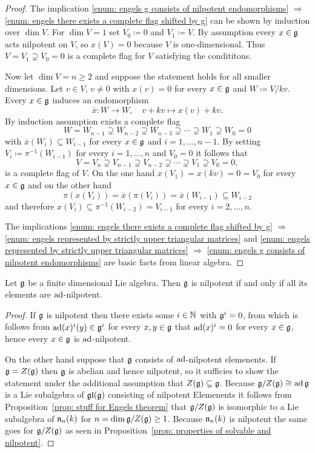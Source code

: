 \begin{proof}
 The implication \ref{enum: engels g consists of nilpotent endomorphisms} $\Rightarrow$ \ref{enum: engels there exists a complete flag shifted by g} can be shown by induction over $\dim V$. For $\dim V = 1$ set $V_0 \coloneqq 0$ and $V_1 \coloneqq V$. By assumption every $x \in \mathfrak{g}$ acts nilpotent on $V$, so $x(V) = 0$ because $V$ is one-dimensional. Thus $V = V_1 \supsetneq V_0 = 0$ is a complete flag for $V$ satisfying the condititons.
   
 Now let $\dim V = n \geq 2$ and suppose the statement holds for all smaller dimensions. Let $v \in V$, $v \neq 0$ with $x(v) = 0$ for every $x \in \mathfrak{g}$ and $W \coloneqq V / kv$. Every $x \in \mathfrak{g}$ induces an endomorphism
 \[
  \overline{x} \colon W \to W, \quad v + kv \mapsto x(v) + kv.
 \]
 By induction assumption exists a complete flag
 \[
  W = W_{n-1} \supsetneq W_{n-2} \supsetneq W_{n-3} \supsetneq \dotsb \supsetneq W_1 \supsetneq W_0 = 0
 \]
 with $\overline{x}(W_i) \subseteq W_{i-1}$ for every $x \in \mathfrak{g}$ and $i = 1, \dotsc, n-1$. By setting $V_i \coloneqq \pi^{-1}(W_{i-1})$ for every $i = 1, \dotsc, n$ and $V_0 = 0$ it follows that
 \[
  V = V_n \supsetneq V_{n-1} \supsetneq V_{n-2} \supsetneq \dotsb \supsetneq V_1 \supsetneq V_0 = 0,
 \]
 is a complete flag of $V$. On the one hand $x(V_1) = x(kv) = 0 = V_0$ for every $x \in \mathfrak{g}$ and on the other hand
 \[
  \pi(x(V_i))
  = \overline{x}(\pi(V_i))
  = \overline{x}(W_{i-1})
  \subseteq W_{i-2}
 \]
 and therefore $x(V_i) \subseteq \pi^{-1}(W_{i-2}) = V_{i-1}$ for every $i = 2, \dotsc, n$.
 
 The implications \ref{enum: engels there exists a complete flag shifted by g} $\Rightarrow$ \ref{enum: engels represented by strictly upper triangular matrices} and \ref{enum: engels represented by strictly upper triangular matrices} $\Rightarrow$ \ref{enum: engels g consists of nilpotent endomorphisms} are basic facts from linear algebra.
\end{proof}


\begin{thrm}[Engel]
 Let $\mathfrak{g}$ be a finite dimensional Lie algebra. Then $\mathfrak{g}$ is nilpotent if and only if all its elements are $\operatorname{ad}$-nilpotent.
\end{thrm}
\begin{proof}
 If $\mathfrak{g}$ is nilpotent then there exists some $i \in \mathbb{N}$ with $\mathfrak{g}^i = 0$, from which is follows from $\operatorname{ad}(x)^i(y) \in \mathfrak{g}^i$ for every $x,y \in \mathfrak{g}$ that $\operatorname{ad}(x)^i = 0$ for every $x \in \mathfrak{g}$, hence every $x \in \mathfrak{g}$ is $\operatorname{ad}$-nilpotent.
 
 On the other hand suppose that $\mathfrak{g}$ consists of $\operatorname{ad}$-nilpotent elemenents. If $\mathfrak{g} = Z(\mathfrak{g})$ then $\mathfrak{g}$ is abelian and hence nilpotent, so it sufficies to show the statement under the additional assumption that $Z(\mathfrak{g}) \subsetneq \mathfrak{g}$. Because $\mathfrak{g}/Z(\mathfrak{g}) \cong \operatorname{ad} \mathfrak{g}$ is a Lie subalgebra of $\mathfrak{gl}(\mathfrak{g})$ consisting of nilpotent Elemenents it follows from Proposition~\ref{prop: stuff for Engels theorem} that $\mathfrak{g}/Z(\mathfrak{g})$ is isomorphic to a Lie subalgebra of $\mathfrak{n}_n(k)$ for $n = \dim \mathfrak{g}/Z(\mathfrak{g}) \geq 1$. Because $\mathfrak{n}_n(k)$ is nilpotent the same goes for $\mathfrak{g}/Z(\mathfrak{g})$ as seen in Proposition~\ref{prop: properties of solvable and nilpotent}.
\end{proof}


